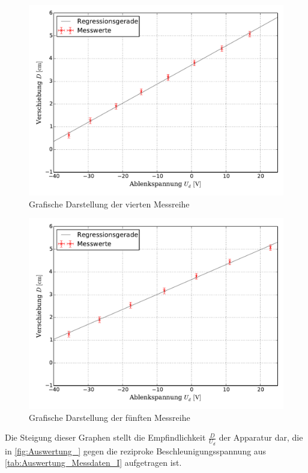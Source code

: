 		\begin{figure}[!h]
				\includegraphics[scale=0.7]{Grafiken/EFeld_Messreihe_IV.pdf}
				\caption{Grafische Darstellung der vierten Messreihe}\label{fig:Auswertung_Messdaten_I_IV}
		\end{figure}
		
		\begin{figure}[!h]
				\includegraphics[scale=0.7]{Grafiken/EFeld_Messreihe_V.pdf}
				\caption{Grafische Darstellung der fünften Messreihe}\label{fig:Auswertung_Messdaten_I_V}
		\end{figure}
		
		Die Steigung dieser Graphen stellt die Empfindlichkeit $\frac{D}{U_{d}}$
		der Apparatur dar, die in \cref{fig:Auswertung_} gegen die reziproke 
		Beschleunigungsspannung aus \cref{tab:Auswertung_Messdaten_I} aufgetragen ist.
		
